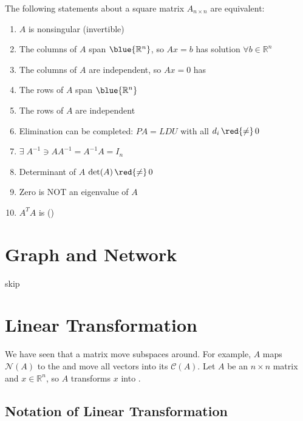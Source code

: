 \newpage

\begin{note}
    The following statements about a square matrix $A_{n \times n}$ are equivalent:
    \begin{enumerate}[label=(\arabic*)]
        \item $A$ is nonsingular (invertible)
        \item The columns of $A$ span $\blue{\mathbb{R}^n}$, so $Ax = b$ has  solution $\forall b \in \mathbb{R}^n$
        \item The columns of $A$ are independent, so $Ax = 0$ has 
        \item The rows of $A$ span $\blue{\mathbb{R}^n}$
        \item The rows of $A$ are independent
        \item Elimination can be completed: $PA = LDU$ with all $d_i\, \red{\neq}\, 0$
        \item $\exists\; A^{-1} \ni AA^{-1} = A^{-1}A = I_n$
        \item Determinant of $A$ $\det(A)\, \red{\neq}\, 0$
        \item Zero is NOT an eigenvalue of $A$
        \item $A^TA$ is  ()
    \end{enumerate}
\end{note}

\section{Graph and Network}
skip

\section{Linear Transformation}
We have seen that a matrix move subspaces around. For example, $A$ maps $\mathcal{N}(A)$ to the  and move all vectors into its  $\mathcal{C}(A)$. Let $A$ be an $n \times n$ matrix and $x \in \mathbb{R}^n$, so $A$ transforms $x$ into .

\subsection{Notation of Linear Transformation}

